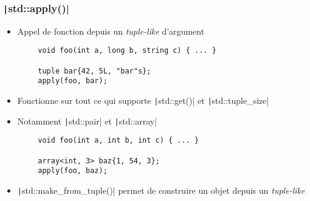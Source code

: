 \documentclass[C++.tex]{subfiles}
\begin{document}
\begin{frame}[fragile]
	\frametitle{\texttt|std::apply()|}
	\begin{itemize}
		\item Appel de fonction depuis un \textit{tuple-like} d'argument
	\end{itemize}

	\begin{verbatim}
		void foo(int a, long b, string c) { ... }

		tuple bar{42, 5L, "bar"s};
		apply(foo, bar);
	\end{verbatim}

	\begin{itemize}
		\item Fonctionne sur tout ce qui supporte \texttt|std::get()| et \texttt|std::tuple_size|
		\item Notamment \texttt|std::pair| et \texttt|std::array|
	\end{itemize}

	\begin{verbatim}
		void foo(int a, int b, int c) { ... }

		array<int, 3> baz{1, 54, 3};
		apply(foo, baz);
	\end{verbatim}

	\begin{itemize}
		\item \texttt|std::make_from_tuple()| permet de construire un objet depuis un \textit{tuple-like}
	\end{itemize}


\end{frame}
\end{document}
